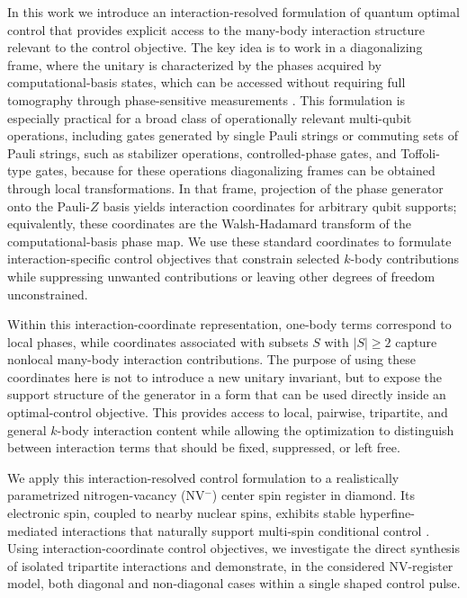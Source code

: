 \documentclass[
  aps,
  pra,
  reprint,            %
  superscriptaddress, %
  amsmath,amssymb,
  notitlepage
]{revtex4-2}
\theoremstyle{plain}
\theoremstyle{definition}
\theoremstyle{definition}
\begin{document}
\medskip
\noindent
In this work we introduce an interaction-resolved formulation of quantum optimal control that provides explicit access to the many-body interaction structure relevant to the control objective. The key idea is to work in a diagonalizing frame, where the unitary is characterized by the phases acquired by computational-basis states, which can be accessed without requiring full tomography through phase-sensitive measurements \cite{childress2006coherent, balasubramanian2009ultralong}. This formulation is especially practical for a broad class of operationally relevant multi-qubit operations, including gates generated by single Pauli strings or commuting sets of Pauli strings, such as stabilizer operations, controlled-phase gates, and Toffoli-type gates, because for these operations diagonalizing frames can be obtained through local transformations. In that frame, projection of the phase generator onto the Pauli-$Z$ basis yields interaction coordinates for arbitrary qubit supports; equivalently, these coordinates are the Walsh-Hadamard transform of the computational-basis phase map. We use these standard coordinates to formulate interaction-specific control objectives that constrain selected $k$-body contributions while suppressing unwanted contributions or leaving other degrees of freedom unconstrained. 



\medskip
\noindent
Within this interaction-coordinate representation, one-body terms correspond to local phases, while coordinates associated with subsets $S$ with $|S|\geq 2$ capture nonlocal many-body interaction contributions. The purpose of using these coordinates here is not to introduce a new unitary invariant, but to expose the support structure of the generator in a form that can be used directly inside an optimal-control objective. This provides access to local, pairwise, tripartite, and general \(k\)-body interaction content while allowing the optimization to distinguish between interaction terms that should be fixed, suppressed, or left free.


\medskip
\noindent
We apply this interaction-resolved control formulation to a realistically parametrized nitrogen-vacancy (NV$^-$) center spin register in diamond. Its electronic spin, coupled to nearby nuclear spins, exhibits stable hyperfine-mediated interactions that naturally support multi-spin conditional control \cite{wang2025circuit, phila, Chen, Schir, neumann, rembold2020introduction}. Using interaction-coordinate control objectives, we investigate the direct synthesis of isolated tripartite interactions and demonstrate, in the considered NV-register model, both diagonal and non-diagonal cases within a single shaped control pulse.
\end{document}
